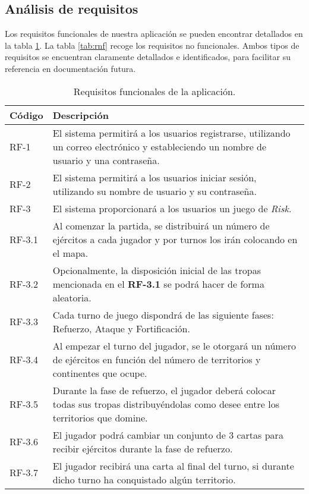 \documentclass[11pt, a4paper, titlepage]{article}
\begin{document}
\subsection{Análisis de requisitos}
Los requisitos funcionales de nuestra aplicación se pueden encontrar detallados en la tabla \ref{tab:rf}. La tabla \ref{tab:rnf} recoge los requisitos no funcionales. Ambos tipos de requisitos se encuentran claramente detallados e identificados, para facilitar su referencia en documentación futura.
\renewcommand{\arraystretch}{1.3}\\
\begin{longtable}[h!]{| p{} | p{} |}
    \caption{Requisitos funcionales de la aplicación.}
    \label{tab:rf}
    \centering
        \hline
         Código & Descripción  \\
         \hline
         RF-1 & El sistema permitirá a los usuarios registrarse, utilizando un correo electrónico y estableciendo un nombre de usuario y una contraseña.\\
         \hline
         RF-2 & El sistema permitirá a los usuarios iniciar sesión, utilizando su nombre de usuario y su contraseña.\\
         \hline
         RF-3 & El sistema proporcionará a los usuarios un juego de \textit{Risk}.\\
         \hline
         RF-3.1 & Al comenzar la partida, se distribuirá un número de ejércitos a cada jugador y por turnos los irán colocando en el mapa.\\
         \hline
         RF-3.2 & Opcionalmente, la disposición inicial de las tropas mencionada en el \textbf{RF-3.1}  se podrá hacer de forma aleatoria.\\
         \hline
         RF-3.3 & Cada turno de juego dispondrá de las siguiente fases: Refuerzo, Ataque y Fortificación. \\
         \hline
         RF-3.4 & Al empezar el turno del jugador, se le otorgará un número de ejércitos en función del número de territorios y continentes que ocupe.\\
         \hline
         RF-3.5 & Durante la fase de refuerzo, el jugador deberá colocar todas sus tropas distribuyéndolas como desee entre los territorios que domine.\\
         \hline
         RF-3.6 & El jugador podrá cambiar un conjunto de 3 cartas para recibir ejércitos durante la fase de refuerzo.\\
         \hline
         RF-3.7 & El jugador recibirá una carta al final del turno, si durante dicho turno ha conquistado algún territorio.\\

\end{longtable}
\end{document}
